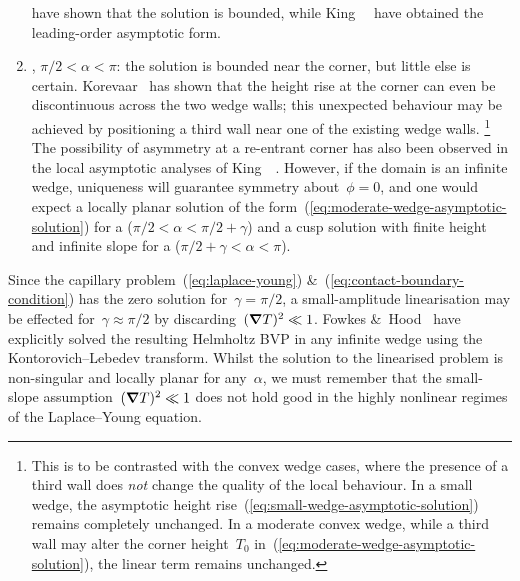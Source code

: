 \begin{enumerate}
    have shown that the solution is bounded,
    while King~\etal~\cite{king-1999-laplace-young-near-corner}
    have obtained the leading-order asymptotic form.
  \item
    , $\pi/2 < \alpha < \pi$:
    the solution is bounded near the corner,
    but little else is certain.
    Korevaar~\cite{korevaar-1980-capillary-re-entrant-corner}
    has shown that the height rise at the corner
    can even be discontinuous across the two wedge walls;
    this unexpected behaviour may be achieved
    by positioning a third wall near one of the existing wedge walls.%
    \footnote{
      This is to be contrasted with the convex wedge cases,
      where the presence of a third wall
      does \emph{not} change the quality of the local behaviour.
      In a small wedge,
      the asymptotic height rise~(\ref{eq:small-wedge-asymptotic-solution})
      remains completely unchanged.
      In a moderate convex wedge,
      while a third wall may alter the corner height~$T_0$
      in~(\ref{eq:moderate-wedge-asymptotic-solution}),
      the linear term remains unchanged.
    }
    The possibility of asymmetry at a re-entrant corner
    has also been observed
    in the local asymptotic analyses
    of King~\etal~\cite{king-1999-laplace-young-near-corner}.
    However, if the domain is an infinite wedge,
    uniqueness will guarantee symmetry about~$\phi = 0$,
    and one would expect a locally planar solution
    of the form~(\ref{eq:moderate-wedge-asymptotic-solution})
    for a  ($\pi/2 < \alpha < \pi/2 + \gamma$)
    and a cusp solution with finite height and infinite slope
    for a  ($\pi/2 + \gamma < \alpha < \pi$).
\end{enumerate}
Since the capillary problem~(\ref{eq:laplace-young})
\&~(\ref{eq:contact-boundary-condition})
has the zero solution for~$\gamma = \pi/2$,
a small-amplitude linearisation may be effected for~$\gamma \approx \pi/2$
by discarding~$(\mathop{}\!\boldsymbol{\mathbf{\nabla}} T)^2 \ll 1$.
Fowkes \&~Hood~\cite{fowkes-1998-surface-tension-effects-wedge}
have explicitly solved the resulting Helmholtz BVP
in any infinite wedge
using the Kontorovich--Lebedev transform.
Whilst the solution to the linearised problem is non-singular
and locally planar for any~$\alpha$,
we must remember that the small-slope assumption~$(\mathop{}\!\boldsymbol{\mathbf{\nabla}} T)^2 \ll 1$
does not hold good
in the highly nonlinear regimes of the Laplace--Young equation.

